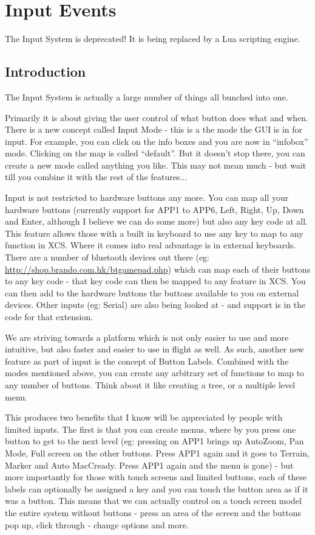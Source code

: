 \section{Input Events}\label{sec:input-events}

\warning The Input System is deprecated!  It is being replaced by a
Lua scripting engine.

\subsection{Introduction}

The Input System is actually a large number of things all bunched into one.

Primarily it is about giving the user control of what button does what
and when. There is a new concept called Input Mode - this is a the
mode the GUI is in for input. For example, you can click on the info
boxes and you are now in ``infobox'' mode. Clicking on the map is called
``default''. But it doesn't stop there, you can create a new mode called
anything you like. This may not mean much - but wait till you combine
it with the rest of the features...

Input is not restricted to hardware buttons any more. You can map all
your hardware buttons (currently support for APP1 to APP6, Left,
Right, Up, Down and Enter, although I believe we can do some more) but
also any key code at all. This feature allows those with a built in
keyboard to use any key to map to any function in XCS. Where it comes
into real advantage is in external keyboards. There are a number of
bluetooth devices out there (eg: \url{http://shop.brando.com.hk/btgamepad.php}) 
which can map each of their
buttons to any key code - that key code can then be mapped to any
feature in XCS. You can then add to the hardware buttons the buttons
available to you on external devices. Other inputs (eg: Serial) are
also being looked at - and support is in the code for that extension.

We are striving towards a platform which is not only easier to use and
more intuitive, but also faster and easier to use in flight as
well. As such, another new feature as part of input is the concept of
Button Labels. Combined with the modes mentioned above, you can create
any arbitrary set of functions to map to any number of buttons. Think
about it like creating a tree, or a multiple level menu.

This produces two benefits that I know will be appreciated by people
with limited inputs. The first is that you can create menus, where by
you press one button to get to the next level (eg: pressing on APP1
brings up AutoZoom, Pan Mode, Full screen on the other buttons. Press
APP1 again and it goes to Terrain, Marker and Auto MacCready. Press
APP1 again and the menu is gone) - but more importantly for those with
touch screens and limited buttons, each of these labels can optionally
be assigned a key and you can touch the button area as if it was a
button.  This means that we can actually control on a touch screen
model the entire system without buttons - press an area of the screen
and the buttons pop up, click through - change options and more.

